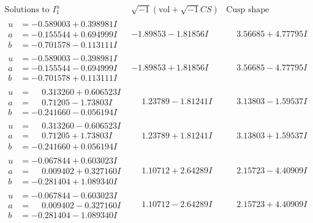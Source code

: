 \documentclass[1p]{elsarticle_modified}
\theoremstyle{definition}
\newcommand{\I}{\sqrt{-1}}
\begin{document}
$$\begin{array}{c|c|c}  
\text{Solutions to }I^u_{1}& \I (\text{vol} + \sqrt{-1}CS) & \text{Cusp shape}\\
 \hline 
\begin{aligned}
u &= -0.589003 + 0.398981 I \\
a &= -0.155544 + 0.694999 I \\
b &= -0.701578 - 0.113111 I\end{aligned}
 & -1.89853 - 1.81856 I & \phantom{-}3.56685 + 4.77795 I \\ \hline\begin{aligned}
u &= -0.589003 - 0.398981 I \\
a &= -0.155544 - 0.694999 I \\
b &= -0.701578 + 0.113111 I\end{aligned}
 & -1.89853 + 1.81856 I & \phantom{-}3.56685 - 4.77795 I \\ \hline\begin{aligned}
u &= \phantom{-}0.313260 + 0.606523 I \\
a &= \phantom{-}0.71205 - 1.73803 I \\
b &= -0.241660 - 0.056194 I\end{aligned}
 & \phantom{-}1.23789 - 1.81241 I & \phantom{-}3.13803 - 1.59537 I \\ \hline\begin{aligned}
u &= \phantom{-}0.313260 - 0.606523 I \\
a &= \phantom{-}0.71205 + 1.73803 I \\
b &= -0.241660 + 0.056194 I\end{aligned}
 & \phantom{-}1.23789 + 1.81241 I & \phantom{-}3.13803 + 1.59537 I \\ \hline\begin{aligned}
u &= -0.067844 + 0.603023 I \\
a &= \phantom{-}0.009402 + 0.327160 I \\
b &= -0.281404 + 1.089340 I\end{aligned}
 & \phantom{-}1.10712 + 2.64289 I & \phantom{-}2.15723 - 4.40909 I \\ \hline\begin{aligned}
u &= -0.067844 - 0.603023 I \\
a &= \phantom{-}0.009402 - 0.327160 I \\
b &= -0.281404 - 1.089340 I\end{aligned}
 & \phantom{-}1.10712 - 2.64289 I & \phantom{-}2.15723 + 4.40909 I \\ \hline\begin{aligned}

\end{aligned}
\end{array}$$
\end{document}
